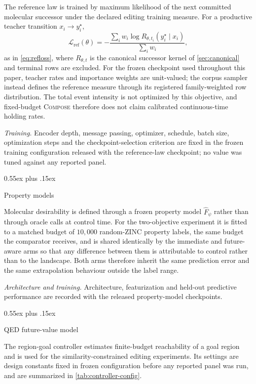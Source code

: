 \documentclass{article}
\makeatletter
\theoremstyle{definition}
\theoremstyle{remark}
\newcommand{\method}{\textsc{Compose}\xspace}
\def\subsection{\@startsection{subsection}{2}{\z@}{-1.2ex plus -0.4ex minus -.2ex}%
  {0.55ex plus .15ex}{\normalsize\sc\raggedright}}
\makeatother
\begin{document}
The reference law is trained by maximum likelihood of the next committed molecular successor under the declared editing training measure. For a productive teacher transition $x_i\rightarrow y^{\star}_i$,
\begin{equation*}
\mathcal{L}_{\mathrm{ref}}(\theta)=-\frac{\sum_i w_i\log R_{\theta,t_i}(y^{\star}_i\mid x_i)}{\sum_i w_i},
\end{equation*}
as in \eqref{eq:refloss}, where $R_{\theta,t}$ is the canonical successor kernel of \cref{sec:canonical} and terminal rows are excluded. For the frozen checkpoint used throughout this paper, teacher rates and importance weights are unit-valued; the corpus sampler instead defines the reference measure through its registered family-weighted row distribution. The total event intensity is not optimized by this objective, and fixed-budget \method{} therefore does not claim calibrated continuous-time holding rates.

\emph{Training.} Encoder depth, message passing, optimizer, schedule, batch size, optimization steps and the checkpoint-selection criterion are fixed in the frozen training configuration released with the reference-law checkpoint; no value was tuned against any reported panel.

\subsection{Property models}

Molecular desirability is defined through a frozen property model $\widehat F_\psi$ rather than through oracle calls at control time. For the two-objective experiment it is fitted to a matched budget of $10{,}000$ random-ZINC property labels, the same budget the comparator receives, and is shared identically by the immediate and future-aware arms so that any difference between them is attributable to control rather than to the landscape. Both arms therefore inherit the same prediction error and the same extrapolation behaviour outside the label range.

\emph{Architecture and training.} Architecture, featurization and held-out predictive performance are recorded with the released property-model checkpoints.

\subsection{{QED} future-value model}
\label{app:controller}

The region-goal controller estimates finite-budget reachability of a goal region
and is used for the similarity-constrained editing experiments. Its settings are
design constants fixed in frozen configuration before any reported panel was run,
and are summarized in \cref{tab:controller-config}.
\end{document}
